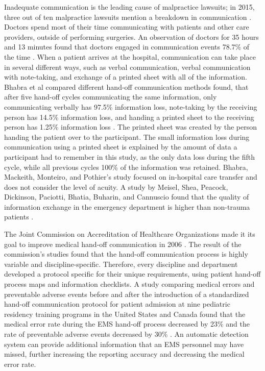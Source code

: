 \par Inadequate communication is the leading cause of malpractice lawsuits; in 2015, three out of ten malpractice lawsuits mention a breakdown in communication \cite{CRICOStrategies.2015}. Doctors spend most of their time communicating with patients and other care providers, outside of performing surgeries. An observation of doctors for 35 hours and 13 minutes found that doctors engaged in communication events 78.7\% of the time \cite{Spencer2004}. When a patient arrives at the hospital, communication can take place in several different ways, such as verbal communication, verbal communication with note-taking, and exchange of a printed sheet with all of the information. Bhabra et al compared different hand-off communication methods found, that after five hand-off cycles communicating the same information, only communicating verbally has 97.5\% information loss, note-taking by the receiving person has 14.5\% information loss, and handing a printed sheet to the receiving person has 1.25\% information loss \cite{Bhabra2007}. The printed sheet was created by the person handing the patient over to the participant. The small information loss during communication using a printed sheet is explained by the amount of data a participant had to remember in this study, as the only data loss during the fifth cycle, while all previous cycles 100\% of the information was retained. Bhabra, Mackeith, Monteiro, and Pothier’s study focused on in-hospital care transfer and does not consider the level of acuity. A study by Meisel, Shea, Peacock, Dickinson, Paciotti, Bhatia, Buharin, and Cannuscio found that the quality of information exchange in the emergency department is higher than non-trauma patients \cite{Meisel2015}.
\par The Joint Commission on Accreditation of Healthcare Organizations made it its goal to improve medical hand-off communication in 2006 \cite{Arora2006}. The result of the commission’s studies found that the hand-off communication process is highly variable and discipline-specific. Therefore, every discipline and department developed a protocol specific for their unique requirements, using patient hand-off process maps and information checklists. A study comparing medical errors and preventable adverse events before and after the introduction of a standardized hand-off communication protocol for patient admission at nine pediatric residency training programs in the United States and Canada found that the medical error rate during the EMS hand-off process decreased by 23\% and the rate of preventable adverse events decreased by 30\% \cite{Starmer2014}. An automatic detection system can provide additional information that an \gls{EMS} personnel may have missed, further increasing the reporting accuracy and decreasing the medical error rate.
